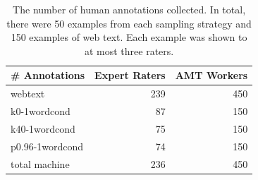 \begin{table}
\small
  \centering
    \begin{tabular}{lrr}
    \hline
    \textbf{\# Annotations} & \textbf{Expert Raters} & \textbf{AMT Workers} \\
    \hline\hline
    webtext & 239   & 450 \\
    \hline
    k0-1wordcond & 87    & 150 \\
    k40-1wordcond & 75    & 150 \\
    p0.96-1wordcond & 74    & 150 \\
    total machine & 236   & 450 \\
    \hline
    \end{tabular}%
  \label{tab:amt_counts}%
  \caption{The number of human annotations collected. In total, there were 50 examples from each sampling strategy and 150 examples of web text. Each example was shown to at most three raters.}
\end{table}

